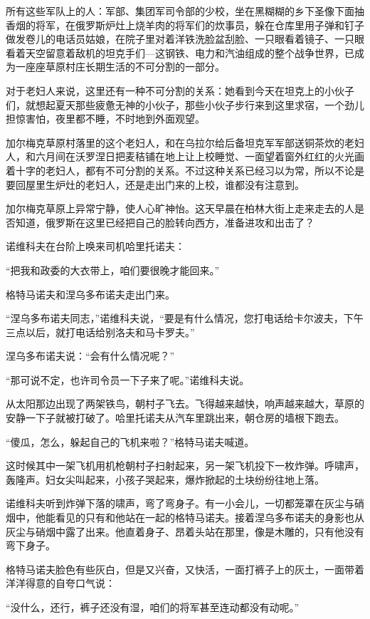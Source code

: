 所有这些军队上的人：军部、集团军司令部的少校，坐在黑糊糊的乡下圣像下面抽香烟的将军，在俄罗斯炉灶上烧羊肉的将军们的炊事员，躲在仓库里用子弹和钉子做发卷儿的电话员姑娘，在院子里对着洋铁洗脸盆刮脸、一只眼看着镜子、一只眼看着天空留意着敌机的坦克手们—这钢铁、电力和汽油组成的整个战争世界，已成为一座座草原村庄长期生活的不可分割的一部分。

对于老妇人来说，这里还有一种不可分割的关系：她看到今天在坦克上的小伙子们，就想起夏天那些疲惫无神的小伙子，那些小伙子步行来到这里求宿，一个劲儿担惊害怕，夜里都不睡，不时地到外面观望。

加尔梅克草原村落里的这个老妇人，和在乌拉尔给后备坦克军军部送铜茶炊的老妇人，和六月间在沃罗涅日把麦秸铺在地上让上校睡觉、一面望着窗外红红的火光画着十字的老妇人，都有不可分割的关系。不过这种关系已经习以为常，所以不论是要回屋里生炉灶的老妇人，还是走出门来的上校，谁都没有注意到。

加尔梅克草原上异常宁静，使人心旷神怡。这天早晨在柏林大街上走来走去的人是否知道，俄罗斯在这里已经把自己的脸转向西方，准备进攻和出击了？

诺维科夫在台阶上唤来司机哈里托诺夫：

“把我和政委的大衣带上，咱们要很晚才能回来。”

格特马诺夫和涅乌多布诺夫走出门来。

“涅乌多布诺夫同志，”诺维科夫说，“要是有什么情况，您打电话给卡尔波夫，下午三点以后，就打电话给别洛夫和马卡罗夫。”

涅乌多布诺夫说：“会有什么情况呢？”

“那可说不定，也许司令员一下子来了呢。”诺维科夫说。

从太阳那边出现了两架铁鸟，朝村子飞去。飞得越来越快，响声越来越大，草原的安静一下子就被打破了。哈里托诺夫从汽车里跳出来，朝仓房的墙根下跑去。

“傻瓜，怎么，躲起自己的飞机来啦？”格特马诺夫喊道。

这时候其中一架飞机用机枪朝村子扫射起来，另一架飞机投下一枚炸弹。呼啸声，轰隆声。妇女尖叫起来，小孩子哭起来，爆炸掀起的土块纷纷往地上落。

诺维科夫听到炸弹下落的啸声，弯了弯身子。有一小会儿，一切都笼罩在灰尘与硝烟中，他能看见的只有和他站在一起的格特马诺夫。接着涅乌多布诺夫的身影也从灰尘与硝烟中露了出来。他直着身子、昂着头站在那里，像是木雕的，只有他没有弯下身子。

格特马诺夫脸色有些灰白，但是又兴奋，又快活，一面打裤子上的灰土，一面带着洋洋得意的自夸口气说：

“没什么，还行，裤子还没有湿，咱们的将军甚至连动都没有动呢。”

